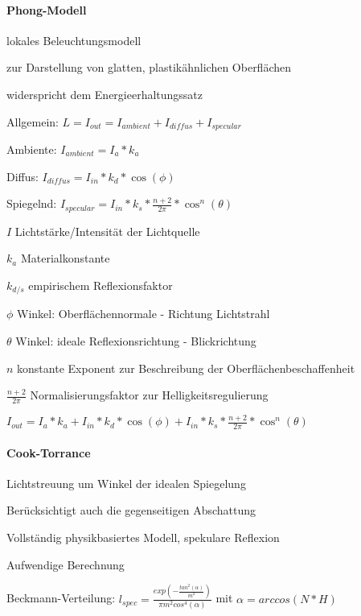 \documentclass[landscape]{article}
\begin{document}
\begin{multicols}{3}
  \paragraph{Phong-Modell}
  \begin{itemize*}
    \item lokales Beleuchtungsmodell
    \item zur Darstellung von glatten, plastikähnlichen Oberflächen
    \item widerspricht dem Energieerhaltungssatz
    \item Allgemein: $L=I_{out}=I_{ambient}+I_{diffus}+I_{specular}$
    \item Ambiente: $I_{ambient}=I_a * k_a$
    \item Diffus: $I_{diffus}=I_{in}*k_d*\cos(\phi)$
    \item Spiegelnd: $I_{specular}=I_{in}*k_s*\frac{n+2}{2\pi}*\cos^n({\theta})$
    \begin{itemize*}
      \item $I$ Lichtstärke/Intensität der Lichtquelle
      \item $k_a$ Materialkonstante
      \item $k_{d/s}$ empirischem Reflexionsfaktor
      \item $\phi$ Winkel: Oberflächennormale - Richtung Lichtstrahl
      \item $\theta$ Winkel: ideale Reflexionsrichtung - Blickrichtung
      \item $n$ konstante Exponent zur Beschreibung der Oberflächenbeschaffenheit
    \end{itemize*}
    \item $\frac{n+2}{2\pi}$ Normalisierungsfaktor zur Helligkeitsregulierung
    \item $I_{out}=I_a*k_a+I_{in}*k_d*\cos(\phi)+I_{in}*k_s*\frac{n+2}{2\pi}*\cos^n(\theta)$
  \end{itemize*}
  
  \paragraph{Cook-Torrance}
  \begin{itemize*}
    \item Lichtstreuung um Winkel der idealen Spiegelung
    \item Berücksichtigt auch die gegenseitigen Abschattung
    \item Vollständig physikbasiertes Modell, spekulare Reflexion
    \item Aufwendige Berechnung
    \item Beckmann-Verteilung: $l_{spec}=\frac{exp(-\frac{tan^2(\alpha)}{m^2})}{\pi m^2 cos^4 (\alpha)}$ mit $\alpha=arccos(N*H)$
  \end{itemize*}
  

\end{multicols}
\end{document}
